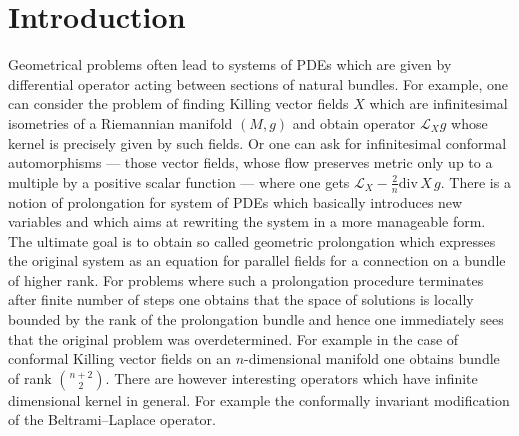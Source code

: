\documentclass[12pt,a4paper,final]{report}
\begin{document}



\hypersetup{unicode}
\hypersetup{breaklinks=true}



\chapter*{Introduction}

Geometrical problems often lead to systems of PDEs which are given by differential operator acting between sections of natural bundles. For example, one can consider the problem of finding Killing vector fields $X$ which are infinitesimal isometries of a Riemannian manifold $(M, g)$ and obtain operator $\mathcal{L}_X g$ whose kernel is precisely given by such fields. Or one can ask for infinitesimal conformal automorphisms --- those vector fields, whose flow preserves metric only up to a multiple by a positive scalar function --- where one gets $\mathcal{L}_X - \frac{2}{n} \mathrm{div}\, X \, g.$ There is a notion of prolongation for system of PDEs which basically introduces new variables and which aims at rewriting the system in a more manageable form. The ultimate goal is to obtain so called geometric prolongation which expresses the original system as an equation for parallel fields for a connection on a bundle of higher rank. For problems where such a prolongation procedure terminates after finite number of steps one obtains that the space of solutions is locally bounded by the rank of the prolongation bundle and hence one immediately sees that the original problem was overdetermined. For example in the case of conformal Killing vector fields on an $n$-dimensional manifold one obtains bundle of rank $\binom{n+2}{2}.$ There are however interesting operators which have infinite dimensional kernel in general. For example the conformally invariant  modification of the Beltrami--Laplace operator.
\end{document}
